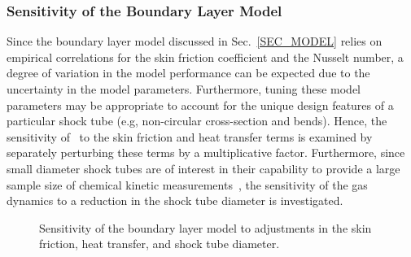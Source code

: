 \subsubsection{Sensitivity of the Boundary Layer Model}
Since the boundary layer model discussed in Sec.~\ref{SEC_MODEL} relies on empirical correlations for the skin friction coefficient and the Nusselt number, a degree of variation in the model performance can be expected due to the uncertainty in the model parameters. Furthermore, tuning these model parameters may be appropriate to account for the unique design features of a particular shock tube (e.g, non-circular cross-section and bends). Hence, the sensitivity of \stnshk\ to the skin friction and heat transfer terms is examined by separately perturbing these terms by a multiplicative factor.  Furthermore, since small diameter shock tubes are of interest in their capability to provide a large sample size of chemical kinetic measurements~\cite{TRANTER_LYNCH_RSI2013}, the sensitivity of the gas dynamics to a reduction in the shock tube diameter is investigated.

\begin{figure}[!h!]
	\centering
	\caption{\label{FIG_SENSANAL} Sensitivity of the boundary layer model to adjustments in the skin friction, heat transfer, and shock tube diameter.}
\end{figure}

